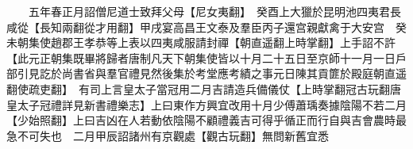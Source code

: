 　　五年春正月詔僧尼道士致拜父母【尼女夷翻】　癸酉上大獵於昆明池四夷君長咸從【長知兩翻從才用翻】甲戌宴高昌王文泰及羣臣丙子還宫親獻禽于大安宫　癸未朝集使趙郡王孝恭等上表以四夷咸服請封禪【朝直遥翻上時掌翻】上手詔不許【此元正朝集既畢將歸者唐制凡天下朝集使皆以十月二十五日至京師十一月一日戶部引見訖於尚書省與羣官禮見然後集於考堂應考績之事元日陳其貢篚於殿庭朝直遥翻使疏吏翻】　有司上言皇太子當冠用二月吉請造兵備儀仗【上時掌翻冠古玩翻唐皇太子冠禮詳見新書禮樂志】上曰東作方興宜改用十月少傅蕭瑀奏據陰陽不若二月【少始照翻】上曰吉凶在人若動依陰陽不顧禮義吉可得乎循正而行自與吉會農時最急不可失也　二月甲辰詔諸州有京觀處【觀古玩翻】無問新舊宜悉